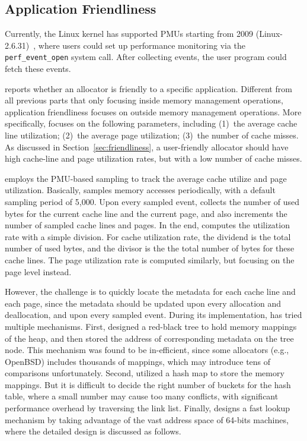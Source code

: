 \subsection{Application Friendliness}
\label{sec:profilefriendliness}

Currently, the Linux kernel has supported PMUs starting from 2009 (Linux-2.6.31)~\cite{pmulinuxsupport}, where users could set up performance monitoring via  the \texttt{perf\_event\_open} system call. After collecting events, the user program could fetch these events. 

\MP{} reports whether an allocator is friendly to a specific application. Different from all previous parts that only focusing inside memory management operations, application friendliness focuses on outside memory management operations. More specifically, \MP{} focuses on the following parameters, including (1)~the average cache line utilization; (2)~the average page utilization; (3)~the number of cache misses. As discussed in Section~\ref{sec:friendliness}, a user-friendly allocator should have high cache-line and page utilization rates, but with a low number of cache misses.  

\MP{} employs the PMU-based sampling to track the average cache utilize and page utilization. Basically, \MP{} samples memory accesses periodically, with a default sampling period of 5,000. Upon every sampled event, \MP{} collects the number of used bytes for the current cache line and the current page, and also increments the number of sampled cache lines and pages. In the end, \MP{} computes the utilization rate with a simple division. For cache utilization rate, the dividend is the total number of used bytes, and the divisor is the the total number of bytes for these cache lines. The page utilization rate is computed similarly, but focusing on the page level instead. 

However, the challenge is to quickly locate the  metadata for each cache line and each page, since the metadata should be updated upon every allocation and deallocation, and upon every sampled event. During its implementation, \MP{} has tried multiple mechanisms. First, \MP{} designed a red-black tree to hold memory mappings of the heap, and then stored the address of corresponding metadata on the tree node. This mechanism was found to be in-efficient, since some allocators (e.g., OpenBSD) includes thousands of mappings, which may introduce tens of comparisons unfortunately. Second, \MP{} utilized a hash map to store the memory mappings. But it is difficult to decide the right number of buckets for the hash table, where a small number may cause too many conflicts, with significant performance overhead by traversing the link list.  Finally, \MP{} designs a fast lookup mechanism by taking advantage of the vast address space of 64-bits machines, where the detailed design is discussed as follows. 

